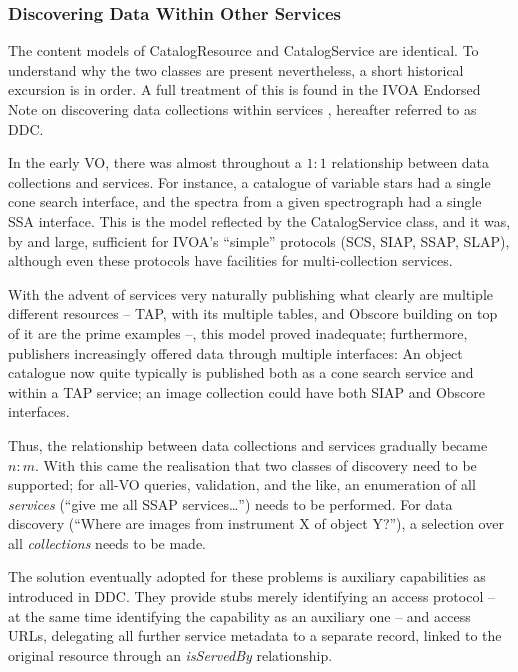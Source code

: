 \documentclass[11pt,a4paper]{ivoa}
\begin{document}
\subsubsection{Discovering Data Within Other Services}
\label{sect:discoverdata}

The content models of CatalogResource and CatalogService are identical.
To understand why the two classes are present nevertheless, a short
historical excursion is in order.  A full treatment of this is found in
the IVOA Endorsed Note on discovering data collections within services
\citep{2019ivoa.spec.0520D}, hereafter referred to as DDC.

In the early VO, there was almost throughout a $1:1$ relationship between
data collections and services.  For instance, a catalogue of variable
stars had a single cone search interface, and the spectra from a given
spectrograph had a single SSA interface.  This is the model reflected by
the CatalogService class, and it was, by and large, sufficient for
IVOA's ``simple'' protocols (SCS, SIAP, SSAP, SLAP), although even these
protocols have facilities for multi-collection services.

With the advent of services very naturally publishing what clearly
are multiple different resources -- TAP, with its multiple tables, and
Obscore building on top of it are the prime examples --, this model
proved inadequate; furthermore, publishers increasingly offered data
through multiple interfaces: An object catalogue now quite typically is
published both as a cone search service and within a TAP service; an
image collection could have both SIAP and Obscore interfaces.

Thus, the relationship between data collections and services gradually
became $n:m$.  With this came the realisation that two classes of
discovery need to be supported; for all-VO queries, validation, and the
like, an enumeration of all \emph{services} (``give me all SSAP
services\dots'') needs to be performed.  For data discovery (``Where are
images from instrument X of object Y?''), a selection over all
\emph{collections} needs to be made.

The solution eventually adopted for these problems is auxiliary
capabilities as introduced in DDC.  They provide stubs merely
identifying an access protocol -- at the same time identifying the
capability as an auxiliary one --  and access URLs, delegating all
further service metadata to a separate record, linked to the original
resource through an \emph{isServedBy} relationship.
\end{document}
